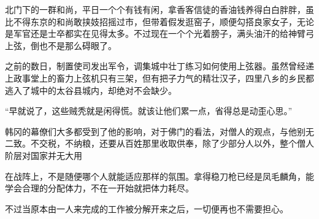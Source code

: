 北门下的一群和尚，平日一个个有钱有闲，拿香客信徒的香油钱养得白白胖胖，虽比不得东京的和尚敢挟妓招摇过市，但带着假发逛窑子，顺便勾搭良家女子，无论是军官还是士卒都实在见得太多。不过现在一个个光着膀子，满头油汗的给神臂弓上弦，倒也不是那么碍眼了。

之前的数日，制置使司发出军令，调集城中壮丁练习如何使用上弦器。虽然曾经递上政事堂上的畜力上弦机只有三架，但有把子力气的精壮汉子，四里八乡的乡民都逃入了城中的太谷县城内，却绝对不会缺少。

“早就说了，这些贼秃就是闲得慌。就该让他们累一点，省得总是动歪心思。”

韩冈的幕僚们大多都受到了他的影响，对于佛门的看法，对僧人的观点，与他别无二致。不交税，不纳粮，还要从百姓那里收取供奉，除了少部分人以外，整个僧人阶层对国家并无大用

在战阵上，不是随便哪个人就能适应那样的氛围。拿得稳刀枪已经是凤毛麟角，能学会合理的分配体力，不在一开始就把体力耗尽。

不过当原本由一人来完成的工作被分解开来之后，一切便再也不需要担心。
